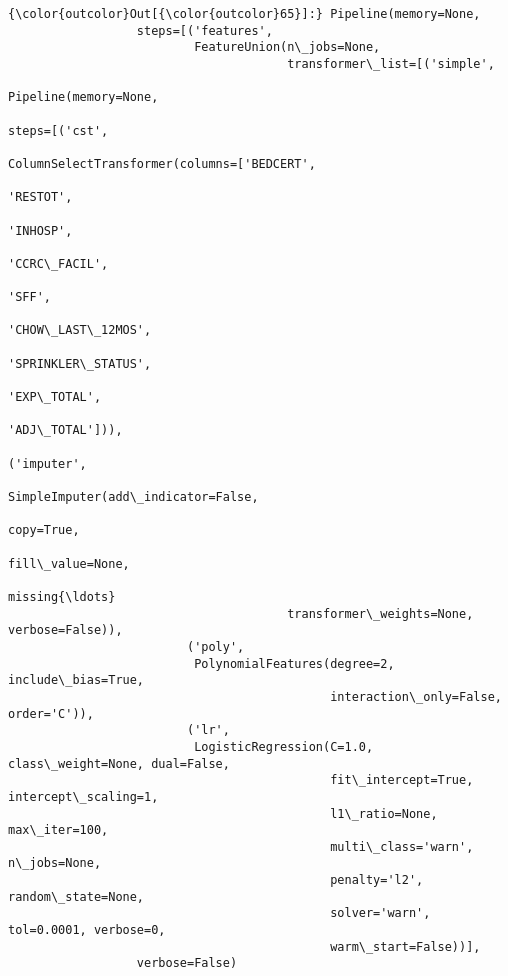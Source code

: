 \documentclass[11pt]{article}
\begin{document}
\begin{Verbatim}[commandchars=\\\{\}]
{\color{outcolor}Out[{\color{outcolor}65}]:} Pipeline(memory=None,
                  steps=[('features',
                          FeatureUnion(n\_jobs=None,
                                       transformer\_list=[('simple',
                                                          Pipeline(memory=None,
                                                                   steps=[('cst',
                                                                           ColumnSelectTransformer(columns=['BEDCERT',
                                                                                                            'RESTOT',
                                                                                                            'INHOSP',
                                                                                                            'CCRC\_FACIL',
                                                                                                            'SFF',
                                                                                                            'CHOW\_LAST\_12MOS',
                                                                                                            'SPRINKLER\_STATUS',
                                                                                                            'EXP\_TOTAL',
                                                                                                            'ADJ\_TOTAL'])),
                                                                          ('imputer',
                                                                           SimpleImputer(add\_indicator=False,
                                                                                         copy=True,
                                                                                         fill\_value=None,
                                                                                         missing{\ldots}
                                       transformer\_weights=None, verbose=False)),
                         ('poly',
                          PolynomialFeatures(degree=2, include\_bias=True,
                                             interaction\_only=False, order='C')),
                         ('lr',
                          LogisticRegression(C=1.0, class\_weight=None, dual=False,
                                             fit\_intercept=True, intercept\_scaling=1,
                                             l1\_ratio=None, max\_iter=100,
                                             multi\_class='warn', n\_jobs=None,
                                             penalty='l2', random\_state=None,
                                             solver='warn', tol=0.0001, verbose=0,
                                             warm\_start=False))],
                  verbose=False)
\end{Verbatim}
            
\end{document}
